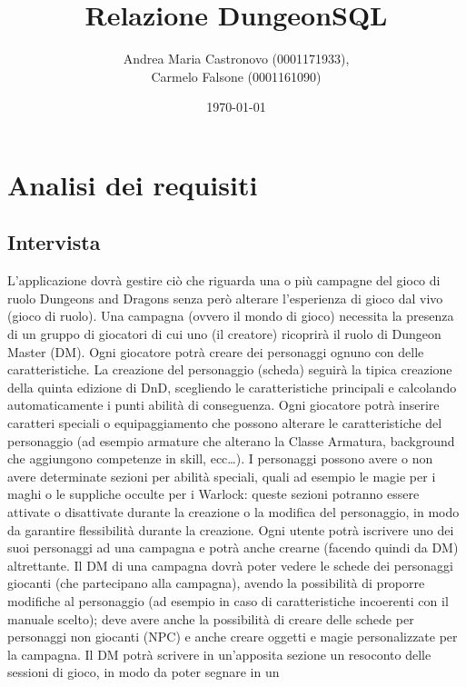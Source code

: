 \documentclass[a4paper,12pt]{report}
\title{Relazione DungeonSQL}
\author{Andrea Maria Castronovo (0001171933), \\ Carmelo Falsone (0001161090)}
\date{\today}
\begin{document}
\maketitle

\tableofcontents

\chapter{Analisi dei requisiti}

\vspace{-20pt}

\section{Intervista}

L'applicazione dovrà gestire ciò che riguarda una o più campagne del gioco di ruolo 
Dungeons and Dragons senza però alterare l'esperienza di gioco dal vivo (gioco di ruolo).
%
Una campagna (ovvero il mondo di gioco) necessita la presenza di un gruppo di giocatori di cui uno (il creatore) 
ricoprirà il ruolo di Dungeon Master (DM). 
%
Ogni giocatore potrà creare dei personaggi ognuno con delle caratteristiche.
La creazione del personaggio (scheda) seguirà la tipica creazione della quinta edizione di DnD, 
scegliendo le caratteristiche principali e calcolando automaticamente i punti abilità di conseguenza. 
%
Ogni giocatore potrà inserire caratteri speciali o equipaggiamento che possono alterare le caratteristiche del 
personaggio (ad esempio armature che alterano la Classe Armatura, background che aggiungono competenze in skill, ecc…).
%
I personaggi possono avere o non avere determinate sezioni per abilità speciali, quali ad esempio le magie per i 
maghi o le suppliche occulte per i Warlock: queste sezioni potranno essere attivate o disattivate durante la 
creazione o la modifica del personaggio, in modo da garantire flessibilità durante la creazione.
%
Ogni utente potrà iscrivere uno dei suoi personaggi ad una campagna e potrà anche crearne (facendo quindi da DM) 
altrettante.
%
Il DM di una campagna dovrà poter vedere le schede dei personaggi giocanti (che partecipano alla campagna), 
avendo la possibilità di proporre modifiche al personaggio (ad esempio in caso di caratteristiche incoerenti 
con il manuale scelto); deve avere anche la possibilità di creare delle schede per personaggi non giocanti (NPC) 
e anche creare oggetti e magie personalizzate per la campagna.
%
Il DM potrà scrivere in un'apposita sezione un resoconto delle sessioni di gioco, in modo da poter segnare in un
\end{document}
